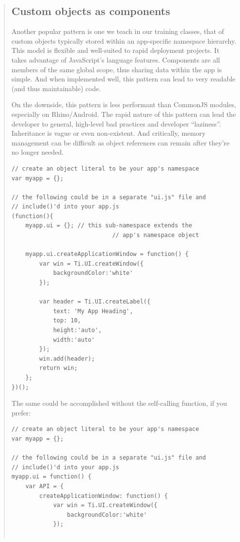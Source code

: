 \documentclass[11pt]{book}
\begin{document}
\begin{quotation}
\subsection{Custom objects as components}
Another popular pattern is one we teach in our training classes, that of custom objects typically stored within an app-specific namespace hierarchy. This model is flexible and well-suited to rapid deployment projects. It takes advantage of JavaScript's language features. Components are all members of the same global scope, thus sharing data within the app is simple. And when implemented well, this pattern can lead to very readable (and thus maintainable) code.

On the downside, this pattern is less performant than CommonJS modules, especially on Rhino/Android. The rapid nature of this pattern can lead the developer to general, high-level bad practices and developer ``laziness''. Inheritance is vague or even non-existent. And critically, memory management can be difficult as object references can remain after they're no longer needed. %

\begin{lstlisting}[frame=single]
// create an object literal to be your app's namespace
var myapp = {};

// the following could be in a separate "ui.js" file and
// include()'d into your app.js
(function(){
    myapp.ui = {}; // this sub-namespace extends the
                             // app's namespace object

    myapp.ui.createApplicationWindow = function() {
        var win = Ti.UI.createWindow({
            backgroundColor:'white'
        });

        var header = Ti.UI.createLabel({
            text: 'My App Heading',
            top: 10,
            height:'auto',
            width:'auto'
        });
        win.add(header);
        return win;
    };
})();
\end{lstlisting}

The same could be accomplished without the self-calling function, if you prefer:
\begin{lstlisting}[frame=single]
// create an object literal to be your app's namespace
var myapp = {};

// the following could be in a separate "ui.js" file and
// include()'d into your app.js
myapp.ui = function() {
    var API = {
        createApplicationWindow: function() {
            var win = Ti.UI.createWindow({
                backgroundColor:'white'
            });


\end{lstlisting}
\end{quotation}
\end{document}
